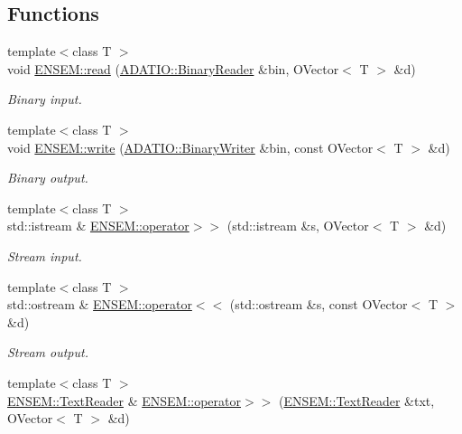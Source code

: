\subsection*{Functions}
\begin{DoxyCompactItemize}
\item 
{\footnotesize template$<$class T $>$ }\\void \mbox{\hyperlink{group__obsvector_ga78b51667ce539bc967764a39c77afbe0}{E\+N\+S\+E\+M\+::read}} (\mbox{\hyperlink{classADATIO_1_1BinaryReader}{A\+D\+A\+T\+I\+O\+::\+Binary\+Reader}} \&bin, O\+Vector$<$ T $>$ \&d)
\begin{DoxyCompactList}\small\item\em Binary input. \end{DoxyCompactList}\item 
{\footnotesize template$<$class T $>$ }\\void \mbox{\hyperlink{group__obsvector_gab76c1efedcd0fb2cbe27c2c995c6d110}{E\+N\+S\+E\+M\+::write}} (\mbox{\hyperlink{classADATIO_1_1BinaryWriter}{A\+D\+A\+T\+I\+O\+::\+Binary\+Writer}} \&bin, const O\+Vector$<$ T $>$ \&d)
\begin{DoxyCompactList}\small\item\em Binary output. \end{DoxyCompactList}\item 
{\footnotesize template$<$class T $>$ }\\std\+::istream \& \mbox{\hyperlink{group__obsvector_ga1777cce8b68792ed5e825b20f286394e}{E\+N\+S\+E\+M\+::operator$>$$>$}} (std\+::istream \&s, O\+Vector$<$ T $>$ \&d)
\begin{DoxyCompactList}\small\item\em Stream input. \end{DoxyCompactList}\item 
{\footnotesize template$<$class T $>$ }\\std\+::ostream \& \mbox{\hyperlink{group__obsvector_ga9f3b52a0bbdae09acbfdfc9471404f5d}{E\+N\+S\+E\+M\+::operator$<$$<$}} (std\+::ostream \&s, const O\+Vector$<$ T $>$ \&d)
\begin{DoxyCompactList}\small\item\em Stream output. \end{DoxyCompactList}\item 
{\footnotesize template$<$class T $>$ }\\\mbox{\hyperlink{classENSEM_1_1TextReader}{E\+N\+S\+E\+M\+::\+Text\+Reader}} \& \mbox{\hyperlink{group__obsvector_gacb0aa516bb0d8f52c729250ac9faff3f}{E\+N\+S\+E\+M\+::operator$>$$>$}} (\mbox{\hyperlink{classENSEM_1_1TextReader}{E\+N\+S\+E\+M\+::\+Text\+Reader}} \&txt, O\+Vector$<$ T $>$ \&d)

\end{DoxyCompactItemize}
